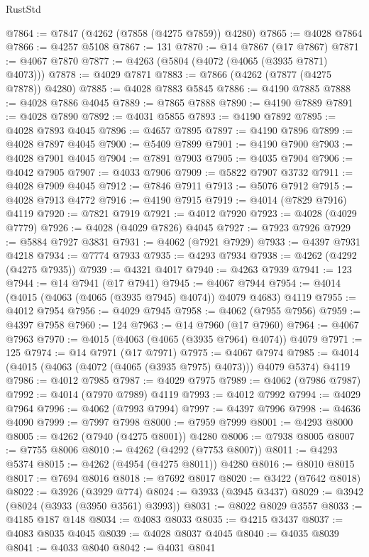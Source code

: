 \begin{lexlean}{RustStd}
\begin{coremodule}
@7864 := @7847 (@4262 (@7858 (@4275 @7859)) @4280)
@7865 := @4028 @7864
@7866 := @4257 @5108
@7867 := 131
@7870 := @14 @7867 (@17 @7867)
@7871 := @4067 @7870
@7877 := @4263 (@5804 (@4072 (@4065 (@3935 @7871) @4073)))
@7878 := @4029 @7871
@7883 := @7866 (@4262 (@7877 (@4275 @7878)) @4280)
@7885 := @4028 @7883 @5845
@7886 := @4190 @7885
@7888 := @4028 @7886 @4045
@7889 := @7865 @7888
@7890 := @4190 @7889
@7891 := @4028 @7890
@7892 := @4031 @5855
@7893 := @4190 @7892
@7895 := @4028 @7893 @4045
@7896 := @4657 @7895
@7897 := @4190 @7896
@7899 := @4028 @7897 @4045
@7900 := @5409 @7899
@7901 := @4190 @7900
@7903 := @4028 @7901 @4045
@7904 := @7891 @7903
@7905 := @4035 @7904
@7906 := @4042 @7905
@7907 := @4033 @7906
@7909 := @5822 @7907 @3732
@7911 := @4028 @7909 @4045
@7912 := @7846 @7911
@7913 := @5076 @7912
@7915 := @4028 @7913 @4772
@7916 := @4190 @7915
@7919 := @4014 (@7829 @7916) @4119
@7920 := @7821 @7919
@7921 := @4012 @7920
@7923 := @4028 (@4029 @7779)
@7926 := @4028 (@4029 @7826) @4045
@7927 := @7923 @7926
@7929 := @5884 @7927 @3831
@7931 := @4062 (@7921 @7929)
@7933 := @4397 @7931 @4218
@7934 := @7774 @7933
@7935 := @4293 @7934
@7938 := @4262 (@4292 (@4275 @7935))
@7939 := @4321 @4017
@7940 := @4263 @7939
@7941 := 123
@7944 := @14 @7941 (@17 @7941)
@7945 := @4067 @7944
@7954 := @4014 (@4015 (@4063 (@4065 (@3935 @7945) @4074)) @4079 @4683) @4119
@7955 := @4012 @7954
@7956 := @4029 @7945
@7958 := @4062 (@7955 @7956)
@7959 := @4397 @7958
@7960 := 124
@7963 := @14 @7960 (@17 @7960)
@7964 := @4067 @7963
@7970 := @4015 (@4063 (@4065 (@3935 @7964) @4074)) @4079
@7971 := 125
@7974 := @14 @7971 (@17 @7971)
@7975 := @4067 @7974
@7985 := @4014 (@4015 (@4063 (@4072 (@4065 (@3935 @7975) @4073))) @4079 @5374) @4119
@7986 := @4012 @7985
@7987 := @4029 @7975
@7989 := @4062 (@7986 @7987)
@7992 := @4014 (@7970 @7989) @4119
@7993 := @4012 @7992
@7994 := @4029 @7964
@7996 := @4062 (@7993 @7994)
@7997 := @4397 @7996
@7998 := @4636 @4090
@7999 := @7997 @7998
@8000 := @7959 @7999
@8001 := @4293 @8000
@8005 := @4262 (@7940 (@4275 @8001)) @4280
@8006 := @7938 @8005
@8007 := @7755 @8006
@8010 := @4262 (@4292 (@7753 @8007))
@8011 := @4293 @5374
@8015 := @4262 (@4954 (@4275 @8011)) @4280
@8016 := @8010 @8015
@8017 := @7694 @8016
@8018 := @7692 @8017
@8020 := @3422 (@7642 @8018)
@8022 := @3926 (@3929 @774)
@8024 := @3933 (@3945 @3437)
@8029 := @3942 (@8024 (@3933 (@3950 @3561) @3993))
@8031 := @8022 @8029 @3557
@8033 := @4185 @187 @148
@8034 := @4083 @8033
@8035 := @4215 @3437
@8037 := @4083 @8035 @4045
@8039 := @4028 @8037 @4045
@8040 := @4035 @8039
@8041 := @4033 @8040
@8042 := @4031 @8041

\end{coremodule}
\end{lexlean}
